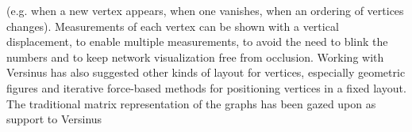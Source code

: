 																																																																																																																																																																																																																																																																																																																																																																																																															(e.g. when a new vertex appears, when one vanishes, when an ordering of vertices changes).
																																																																																																																																																																																																																																																																																																																																																																																																															Measurements of each vertex can be shown with a vertical displacement,
																																																																																																																																																																																																																																																																																																																																																																																																															to enable multiple measurements, to avoid the need to blink the numbers and to keep network visualization free from occlusion.
																																																																																																																																																																																																																																																																																																																																																																																																															Working with Versinus has also suggested other kinds of layout for vertices, 
																																																																																																																																																																																																																																																																																																																																																																																																															especially geometric figures and iterative force-based methods for positioning vertices in a fixed layout.
																																																																																																																																																																																																																																																																																																																																																																																																															The traditional matrix representation of the graphs has been gazed upon as support to Versinus 
